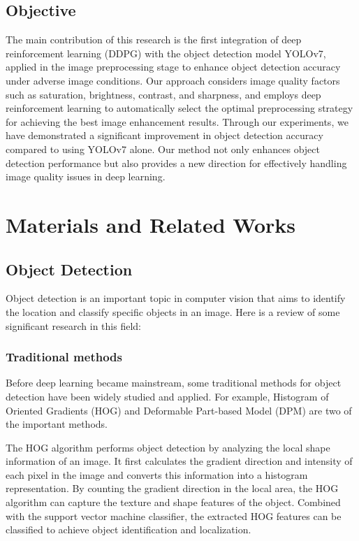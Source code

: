 \documentclass[PhD]{PHlab-thesis}
\begin{document}
\section{Objective}
The main contribution of this research is the first integration of deep reinforcement learning (DDPG) with the object detection model YOLOv7, applied in the image preprocessing stage to enhance object detection accuracy under adverse image conditions. Our approach considers image quality factors such as saturation, brightness, contrast, and sharpness, and employs deep reinforcement learning to automatically select the optimal preprocessing strategy for achieving the best image enhancement results. Through our experiments, we have demonstrated a significant improvement in object detection accuracy compared to using YOLOv7 alone. Our method not only enhances object detection performance but also provides a new direction for effectively handling image quality issues in deep learning.


\chapter{Materials and Related Works}
\section{Object Detection}
Object detection is an important topic in computer vision that aims to identify the location and classify specific objects in an image. Here is a review of some significant research in this field:

\subsection{Traditional methods}
Before deep learning became mainstream, some traditional methods for object detection have been widely studied and applied. For example, Histogram of Oriented Gradients (HOG) \cite{dalal2005histograms} and Deformable Part-based Model (DPM) \cite{felzenszwalb2009object} are two of the important methods.

The HOG algorithm performs object detection by analyzing the local shape information of an image. It first calculates the gradient direction and intensity of each pixel in the image and converts this information into a histogram representation. By counting the gradient direction in the local area, the HOG algorithm can capture the texture and shape features of the object. Combined with the support vector machine classifier, the extracted HOG features can be classified to achieve object identification and localization. 
\end{document}

